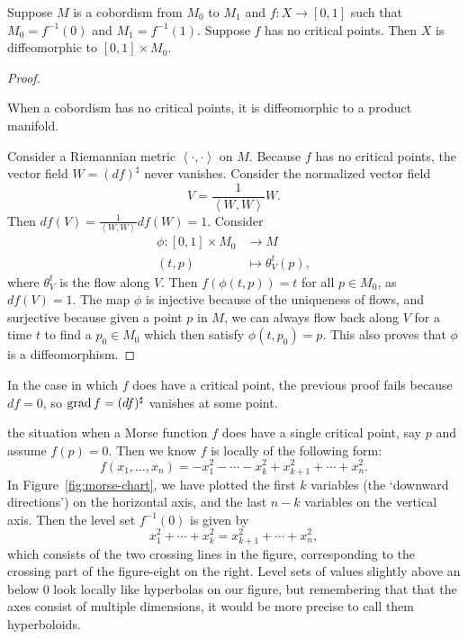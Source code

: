\begin{prop}
    Suppose $M$ is a cobordism from $M_0$ to $ M_1$ and $f : X \to [0, 1] $ such that $M_0 = f^{-1}(0)$ and $M_1 = f^{-1}(1)$.
    Suppose $f$ has no critical points. Then $X$ is diffeomorphic to $[0, 1] \times  M_0$.
\end{prop}
\begin{proof}
    \begin{marginfigure}
        \centering
        \caption{
            When a cobordism has no critical points, it is diffeomorphic to a product manifold. }
        \label{fig:proof-of-cobordism-without-critical-points}
    \end{marginfigure}
    Consider a Riemannian metric $\left<\cdot ,\cdot  \right>$ on $M$.
    Because  $f$ has no critical points, the vector field $W = (df)^{\sharp}$ never vanishes.
    Consider the normalized vector field
    \[
    V = \frac{1}{\left<W, W \right>} W
    .\] 
    Then $df(V) = \frac{1}{\left<W, W \right>} df(W) = 1$.
    Consider
    \begin{align*}
        \phi: [0, 1] \times M_0&\longrightarrow M \\
        (t, p) &\longmapsto \theta_V^{t}(p)
    ,\end{align*}
    where $\theta_V^{t}$ is the flow along $V$.
    Then $f(\phi(t, p)) = t$ for all $p \in M_0$, as $df(V) = 1$.
    The map $\phi$ is injective because of the uniqueness of flows, and surjective because given a point $p$ in $M$, we can always flow back along $V$ for a time $t$ to find a $p_0 \in M_0$ which then satisfy $\phi(t, p_0) = p$. 
    This also proves that $\phi$ is a diffeomorphism.
\end{proof}



In the case in which $f$ does have a critical point, the previous proof fails because $df = 0$, so $\operatorname{grad} f = (df)^{\sharp}$ vanishes at some point.


 the situation when a Morse function $f$ does have a single critical point, say $p$ and assume $f(p) = 0$.
Then we know $f$ is locally of the following form:
\[
    f(x_1, \ldots, x_n) = - x_1^2 - \cdots - x_k^2 + x_{k+1}^2 + \cdots + x_n^2
.\] 
In Figure~\ref{fig:morse-chart}, we have plotted the first $k$ variables (the `downward directions') on the horizontal axis, and the last $n-k$ variables on the vertical axis.
Then the level set $f^{-1}(0)$ is given by
\[
x_1^2 + \cdots + x_k^2 = x_{k+1} ^2 + \cdots + x_n^2
,\] 
which consists of the two crossing lines in the figure, corresponding to the crossing part of the figure-eight on the right.
Level sets of values slightly above an below $0$ look locally like hyperbolas on our figure, but remembering that that the axes consist of multiple dimensions, it would be more precise to call them hyperboloids.

